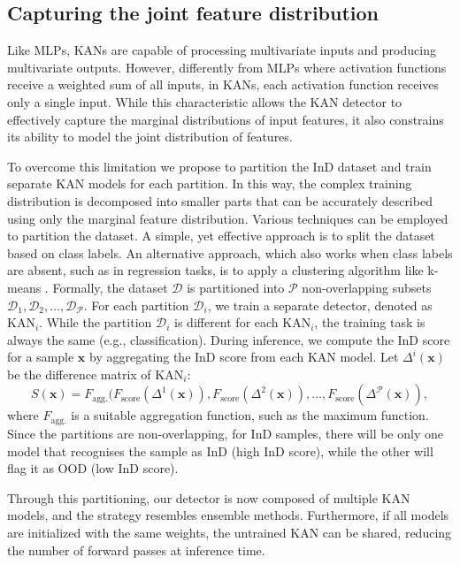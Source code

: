 \vspace{1pt}
\subsection{Capturing the joint feature distribution}
Like MLPs, KANs are capable of processing multivariate inputs and producing multivariate outputs. 
However, differently from MLPs where activation functions receive a weighted sum of all inputs, in KANs, each activation function receives only a single input. 
While this characteristic allows the KAN detector to effectively capture the marginal distributions of input features, it also constrains its ability to model the joint distribution of features.

To overcome this limitation we propose to partition the InD dataset and train separate KAN models for each partition. 
In this way, the complex training distribution is decomposed into smaller parts that can be accurately described using only the marginal feature distribution.
Various techniques can be employed to partition the dataset. 
A simple, yet effective approach is to split the dataset based on class labels.
An alternative approach, which also works when class labels are absent, such as in regression tasks, is to apply a clustering algorithm like k-means \citep{1056489}.
Formally, the dataset \( \mathcal{D} \) is partitioned into $\mathcal{P}$ non-overlapping subsets \( \mathcal{D}_1, \mathcal{D}_2, \ldots, \mathcal{D}_\mathcal{P} \). 
For each partition \( \mathcal{D}_i \), we train a separate detector, denoted as \( \text{KAN}_i \).
While the partition \( \mathcal{D}_i \) is different for each \(\text{KAN}_i \), the training task is always the same (e.g., classification).
During inference, we compute the InD score for a sample \( \textbf{x} \) by aggregating the InD score from each KAN model. 
Let \( \Delta^{i}(\textbf{x})\) be the difference matrix of \( \text{KAN}_i \):
\begin{equation}
S(\textbf{x}) = F_{\text{agg.}}(F_{\text{score}}(\Delta^{1}(\textbf{x})), F_{\text{score}}(\Delta^{2}(\textbf{x})), \ldots, F_{\text{score}}(\Delta^{\mathcal{P}}(\textbf{x})),
\end{equation}
where \( F_{\text{agg.}} \) is a suitable aggregation function, such as the maximum function.
Since the partitions are non-overlapping, for InD samples, there will be only one model that recognises the sample as InD (high InD score), while the other will flag it as OOD (low InD score).

Through this partitioning, our detector is now composed of multiple KAN models, and the strategy resembles ensemble methods. 
Furthermore, if all models are initialized with the same weights, the untrained KAN can be shared, reducing the number of forward passes at inference time.

